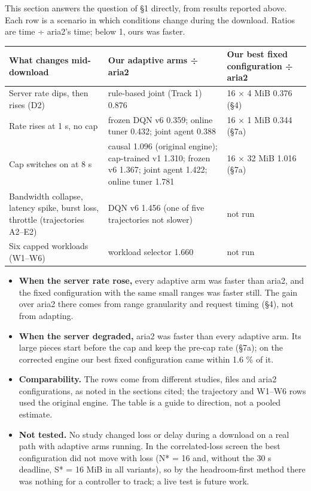 \documentclass[10pt,a4paper]{article}
\begin{document}
This section answers the question of §1 directly, from results reported above. Each row is a scenario in which conditions change during the download. Ratios are time ÷ aria2's time; below 1, ours was faster.


{\small\begin{tabularx}{\linewidth}{@{}LLL@{}}
\toprule
\textbf{What changes mid-download} & \textbf{Our adaptive arms ÷ aria2} & \textbf{Our best fixed configuration ÷ aria2}\\
\midrule
Server rate dips, then rises (D2) & rule-based joint (Track 1) 0.876 & 16 × 4 MiB 0.376 (§4)\\
Rate rises at 1 s, no cap & frozen DQN v6 0.359; online tuner 0.432; joint agent 0.388 & 16 × 1 MiB 0.344 (§7a)\\
Cap switches on at 8 s & causal 1.096 (original engine); cap-trained v1 1.310; frozen v6 1.367; joint agent 1.422; online tuner 1.781 & 16 × 32 MiB 1.016 (§7a)\\
Bandwidth collapse, latency spike, burst loss, throttle (trajectories A2–E2) & DQN v6 1.456 (one of five trajectories not slower) & not run\\
Six capped workloads (W1–W6) & workload selector 1.660 & not run\\
\bottomrule
\end{tabularx}}


\begin{itemize}
\item \textbf{When the server rate rose,} every adaptive arm was faster than aria2, and the fixed configuration with the same small ranges was faster still. The gain over aria2 there comes from range granularity and request timing (§4), not from adapting.
\item \textbf{When the server degraded,} aria2 was faster than every adaptive arm. Its large pieces start before the cap and keep the pre-cap rate (§7a); on the corrected engine our best fixed configuration came within 1.6 \% of it.
\item \textbf{Comparability.} The rows come from different studies, files and aria2 configurations, as noted in the sections cited; the trajectory and W1–W6 rows used the original engine. The table is a guide to direction, not a pooled estimate.
\item \textbf{Not tested.} No study changed loss or delay during a download on a real path with adaptive arms running. In the correlated-loss screen the best configuration did not move with loss (N* = 16 and, without the 30 s deadline, S* = 16 MiB in all variants), so by the headroom-first method there was nothing for a controller to track; a live test is future work.
\end{itemize}
\end{document}

